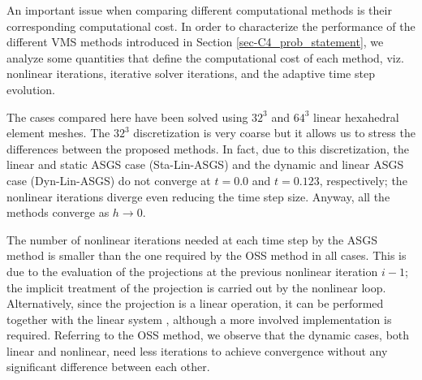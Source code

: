 An important issue when comparing different computational methods is their corresponding computational cost. In order to characterize the performance of the different VMS methods introduced in Section \ref{sec-C4_prob_statement},  we analyze  some quantities that define the computational cost of each method, viz. nonlinear iterations, iterative solver iterations, and the adaptive time step evolution.


The cases compared here have been solved using $32^3$ and $64^3$ linear hexahedral element meshes. The $32^3$ discretization is very coarse but it allows us to stress the differences between the proposed methods. In fact, due to this discretization, the linear and static ASGS case (Sta-Lin-ASGS) and the dynamic and linear ASGS case (Dyn-Lin-ASGS) do not converge at $t=0.0$ and  $t=0.123$, respectively; the nonlinear iterations diverge even reducing the time step size. Anyway, all the methods converge as $h\rightarrow0$.


The number of nonlinear iterations needed at each time step by the ASGS method is smaller than the one required by the OSS method in all cases. This is due to the evaluation of the projections at the previous nonlinear iteration $i-1$; the implicit treatment of the projection is carried out by the nonlinear loop. Alternatively, since the projection is a linear operation, it can be performed together with the linear system \cite{Codina_2008a}, although a more involved implementation is required. Referring to the OSS method, we observe that the dynamic cases, both linear and nonlinear, need less iterations to achieve convergence without any significant difference between each other.

